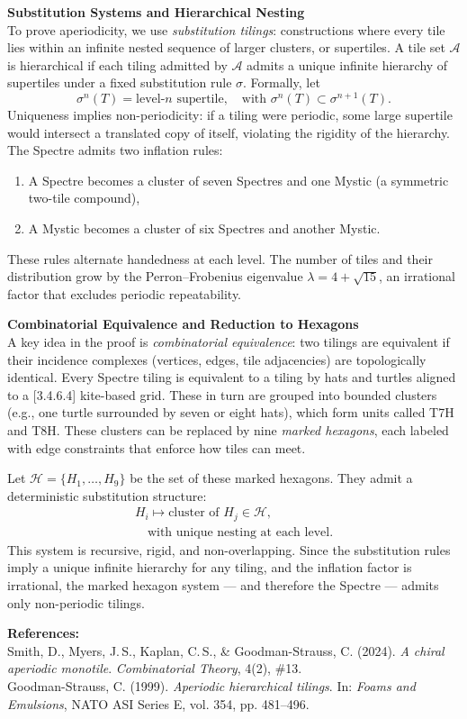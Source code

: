 \begin{technical}
\textbf{Substitution Systems and Hierarchical Nesting}\\[0.5em]
To prove aperiodicity, we use \emph{substitution tilings}: constructions where every tile lies within an infinite nested sequence of larger clusters, or supertiles. A tile set \( \mathcal{A} \) is hierarchical if each tiling admitted by \( \mathcal{A} \) admits a unique infinite hierarchy of supertiles under a fixed substitution rule \( \sigma \). Formally, let
\[
\sigma^n(T) = \text{level-}n \text{ supertile}, \quad \text{with } \sigma^n(T) \subset \sigma^{n+1}(T).
\]
Uniqueness implies non-periodicity: if a tiling were periodic, some large supertile would intersect a translated copy of itself, violating the rigidity of the hierarchy. The Spectre admits two inflation rules:
\begin{enumerate}
    \item A Spectre becomes a cluster of seven Spectres and one Mystic (a symmetric two-tile compound),
    \item A Mystic becomes a cluster of six Spectres and another Mystic.
\end{enumerate}
These rules alternate handedness at each level. The number of tiles and their distribution grow by the Perron–Frobenius eigenvalue \( \lambda = 4 + \sqrt{15} \), an irrational factor that excludes periodic repeatability.

\textbf{Combinatorial Equivalence and Reduction to Hexagons}\\[0.5em]
A key idea in the proof is \emph{combinatorial equivalence}: two tilings are equivalent if their incidence complexes (vertices, edges, tile adjacencies) are topologically identical. Every Spectre tiling is equivalent to a tiling by hats and turtles aligned to a [3.4.6.4] kite-based grid. These in turn are grouped into bounded clusters (e.g., one turtle surrounded by seven or eight hats), which form units called T7H and T8H. These clusters can be replaced by nine \emph{marked hexagons}, each labeled with edge constraints that enforce how tiles can meet.

Let \( \mathcal{H} = \{H_1, \dots, H_9\} \) be the set of these marked hexagons. They admit a deterministic substitution structure:
\begin{align}
H_i \mapsto \text{cluster of } H_j \in \mathcal{H}, \\\quad \text{with unique nesting at each level}.
\end{align}
This system is recursive, rigid, and non-overlapping. Since the substitution rules imply a unique infinite hierarchy for any tiling, and the inflation factor is irrational, the marked hexagon system — and therefore the Spectre — admits only non-periodic tilings.

\vspace{0.5em}
\textbf{References:}\\
Smith, D., Myers, J.\,S., Kaplan, C.\,S., \& Goodman-Strauss, C. (2024). \emph{A chiral aperiodic monotile}. \textit{Combinatorial Theory}, 4(2), \#13.\\
Goodman-Strauss, C. (1999). \emph{Aperiodic hierarchical tilings}. In: \textit{Foams and Emulsions}, NATO ASI Series E, vol. 354, pp. 481–496.
\end{technical}
